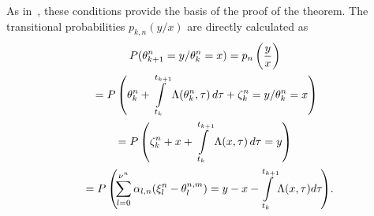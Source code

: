 \begin{multicols}{2}
As in~\cite{4-b, 5-b}, these conditions provide the basis of the proof of the theorem. 
The transitional probabilities $p_{k,n} (y/x)$ are directly calculated as
\begin{multline*}
P(\theta_{k+1}^{n}  =y/\theta_{k}^{n} = x) = p_{n} \left(\displaystyle\frac{\displaystyle y\mathstrut}{\displaystyle x\mathstrut}\right)\\
{} = P\left(\theta_{k}^{n} + \int\limits_{t_{k} }^{t_{k+1} }
\Lambda (\theta_{k}^{n}  ,\tau )\,d\tau +\zeta_{k}^{n}=y/ \theta_{k}^{n} 
=x\right)\\
 = 
P\left(\zeta_{k}^{n} +x+\int\limits_{t_{k} }^{t_{k+1} }\Lambda (x,\tau )\,d\tau =y\right) \\
{}=
P\left(\!\sum\limits_{l=0}^{\nu ^{n} }\alpha_{l,n} ( \xi_{l}^{n} -\theta_{l}^{n,m} )= 
y-x-\!\int\limits_{t_{k} }^{t_{k+1} }\!\Lambda (x,\tau )d\tau \!\right)\!.\hspace*{-5.75145pt}
\end{multline*}


\end{multicols}
